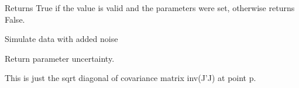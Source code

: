 \documentclass[letterpaper,10pt,english]{sphinxmanual}
\begin{document}
\begin{fulllineitems}
\begin{fulllineitems}
Returns True if the value is valid and the parameters were set,
otherwise returns False.

\end{fulllineitems}


\begin{fulllineitems}
\label{api/fitproblem:refl1d.fitproblem.FitProblem.show}
\end{fulllineitems}


\begin{fulllineitems}
\label{api/fitproblem:refl1d.fitproblem.FitProblem.simulate_data}
Simulate data with added noise

\end{fulllineitems}


\begin{fulllineitems}
\label{api/fitproblem:refl1d.fitproblem.FitProblem.stderr}
Return parameter uncertainty.

This is just the sqrt diagonal of covariance matrix inv(J'J) at point p.

\end{fulllineitems}


\begin{fulllineitems}
\label{api/fitproblem:refl1d.fitproblem.FitProblem.valid}
\end{fulllineitems}


\end{fulllineitems}

\end{document}
